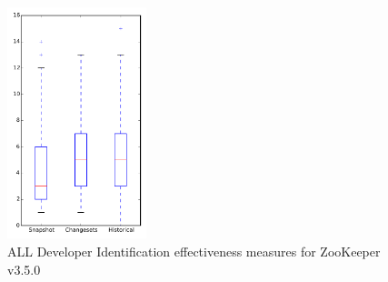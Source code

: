 
\begin{figure}[t]
\centering
\includegraphics[width=0.36\textwidth]{figures/dit/all_zookeeper}
\caption{ALL Developer Identification effectiveness measures for ZooKeeper v3.5.0}
\label{fig:dit:all:zookeeper}
\end{figure}
